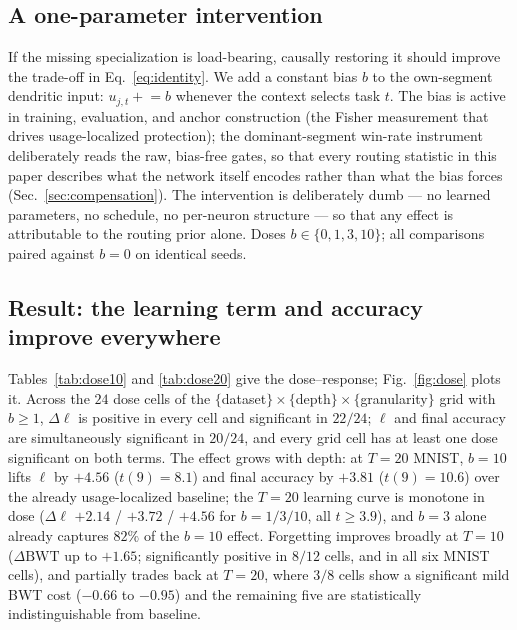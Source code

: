 \documentclass[review,12pt,number]{elsarticle}
\begin{document}
\subsection{A one-parameter intervention}

If the missing specialization is load-bearing, causally restoring it should
improve the trade-off in Eq.~\eqref{eq:identity}. We add a constant bias $b$
to the own-segment dendritic input: $u_{j,t} \mathrel{+}= b$ whenever the
context selects task $t$. The bias is active in training, evaluation, and
anchor construction (the Fisher measurement that drives usage-localized
protection); the dominant-segment win-rate instrument deliberately reads
the raw, bias-free gates, so that every routing statistic in this paper
describes what the network itself encodes rather than what the bias
forces (Sec.~\ref{sec:compensation}). The intervention is deliberately
dumb --- no learned parameters, no schedule, no per-neuron structure ---
so that any effect is attributable to the routing prior alone. Doses
$b \in \{0, 1, 3, 10\}$; all comparisons paired against $b{=}0$ on
identical seeds.

\subsection{Result: the learning term and accuracy improve everywhere}

Tables~\ref{tab:dose10} and \ref{tab:dose20} give the dose--response;
Fig.~\ref{fig:dose} plots it. Across the $24$ dose cells of the
$\{$dataset$\}\times\{$depth$\}\times\{$granularity$\}$ grid with
$b \ge 1$, $\Delta\ell$ is positive in every cell and significant in
$22/24$; $\ell$ and final accuracy are simultaneously significant in
$20/24$, and every grid cell has at least one dose significant on both
terms. The effect grows with depth: at $T{=}20$ MNIST, $b{=}10$ lifts
$\ell$ by $+4.56$ ($t(9){=}8.1$) and final accuracy by $+3.81$
($t(9){=}10.6$) over the already usage-localized baseline; the
$T{=}20$ learning curve is monotone in dose
($\Delta\ell$ $+2.14$ / $+3.72$ / $+4.56$ for $b{=}1/3/10$, all
$t \ge 3.9$), and $b{=}3$ alone already captures $82\%$ of the
$b{=}10$ effect. Forgetting
improves broadly at $T{=}10$ ($\Delta\mathrm{BWT}$ up to $+1.65$;
significantly positive in $8/12$ cells, and in all six MNIST cells), and
partially trades back at $T{=}20$, where $3/8$ cells show a significant
mild BWT cost ($-0.66$ to $-0.95$) and the remaining five are
statistically indistinguishable from baseline.
\end{document}
